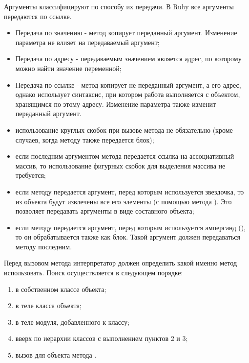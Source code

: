 Аргументы классифицируют по способу их передачи. В Ruby все аргументы передаются по ссылке.
\begin{itemize}
  \item Передача по значению - метод копирует переданный аргумент. Изменение параметра не влияет на передаваемый аргумент;

  \item Передача по адресу - передаваемым значением является адрес, по которому можно найти значение переменной;

  \item Передача по ссылке - метод копирует не переданный аргумент, а его адрес, однако использует синтаксис, при котором работа выполняется с объектом, хранящимся по этому адресу. Изменение параметра также изменит переданный аргумент.
\end{itemize}

\begin{itemize}
  \item использование круглых скобок при вызове метода не обязательно (кроме случаев, когда методу также передается блок);

  \item если последним аргументом метода передается ссылка на ассоциативный массив, то использование фигурных скобок для выделения массива не требуется;

  \item если методу передается аргумент, перед которым используется звездочка, то из объекта будут извлечены все его элементы (с помощью метода ). Это позволяет передавать аргументы в виде составного объекта;

  \item если методу передается аргумент, перед которым используется амперсанд (\mono{\&}), то он обрабатывается также как блок. Такой аргумент должен передаваться методу последним.  
\end{itemize}

Перед вызовом метода интерпретатор должен определить какой именно метод использовать. Поиск осуществляется в следующем порядке:
\begin{enumerate}
  \item в собственном классе объекта;
  \item в теле класса объекта;
  \item в теле модуля, добавленного к классу;
  \item вверх по иерархии классов с выполнением пунктов 2 и 3;
  \item вызов для объекта метода . 
\end{enumerate}


